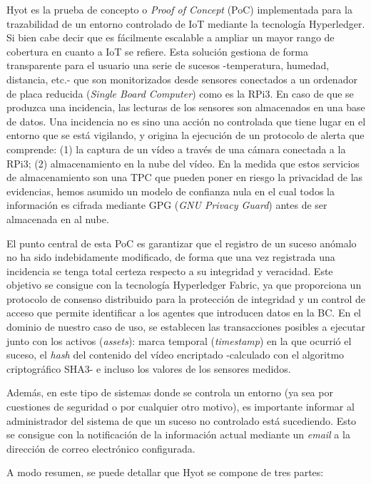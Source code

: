 \documentclass[10pt,conference,a4paper]{IEEEtran}
\begin{document}
Hyot es la prueba de concepto o \textit{Proof of Concept} (PoC)
implementada para la trazabilidad de un entorno controlado de IoT
mediante la tecnología Hyperledger. Si bien cabe decir que es
fácilmente escalable a ampliar un mayor rango de cobertura en cuanto a
IoT se refiere. Esta solución gestiona de forma transparente para el
usuario una serie de sucesos -temperatura, humedad, distancia, etc.-
que son monitorizados desde sensores conectados a un ordenador de
placa reducida (\textit{Single Board Computer}) como es la RPi3. En caso de que se produzca una incidencia, las lecturas de los
sensores son almacenados en una base de datos. Una incidencia no es
sino una acción no controlada que tiene lugar en el entorno que se
está vigilando, y origina la ejecución de un protocolo de alerta que
comprende: (1) la captura de un vídeo a través de una cámara conectada
a la RPi3; (2) almacenamiento en la nube del vídeo. En la
medida que estos servicios de almacenamiento son una TPC que pueden
poner en riesgo la privacidad de las evidencias, hemos asumido un
modelo de confianza nula en el cual todos la información es cifrada
mediante  GPG (\textit{GNU Privacy Guard}) antes de ser almacenada en
al nube.

El punto central de esta PoC es garantizar que el
registro de un  suceso anómalo no ha sido indebidamente
modificado, de forma que una vez registrada una incidencia se tenga
total certeza respecto a su integridad y veracidad. Este objetivo se
consigue con la tecnología Hyperledger Fabric, ya que proporciona un
protocolo de consenso distribuido para la protección de integridad y
un control de acceso que permite identificar a los agentes que
introducen datos en la BC. En el dominio de nuestro caso de uso, se establecen las transacciones posibles a ejecutar junto con
los activos (\textit{assets}): marca temporal (\textit{timestamp}) en
la que ocurrió el suceso, el \textit{hash} del contenido del vídeo
encriptado -calculado con el algoritmo criptográfico SHA3- e incluso
los valores de los sensores medidos.

Además, en este tipo de sistemas donde se controla un entorno (ya sea
por cuestiones de seguridad o por cualquier otro motivo), es importante
informar al administrador del sistema de que un suceso no
controlado está sucediendo. Esto se consigue con la notificación de la
información actual mediante un \textit{email} a la dirección de correo
electrónico configurada.

A modo resumen, se puede detallar que Hyot se compone de tres partes:
\end{document}
